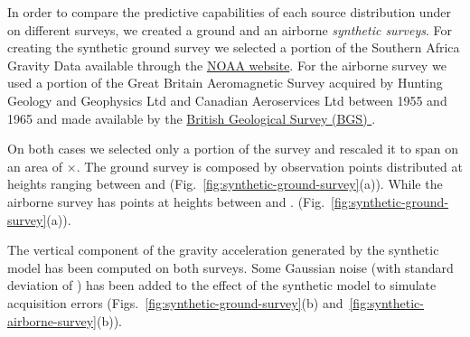 \documentclass[twocolumn]{article}
\begin{document}
In order to compare the predictive capabilities of each source distribution
under on different surveys, we created a ground and an airborne \emph{synthetic
surveys}.
For creating the synthetic ground survey we selected a portion of the Southern
Africa Gravity Data available through the
\href{https://www.ngdc.noaa.gov/mgg/gravity/gravity.html}{NOAA website}.
For the airborne survey we used a portion of the Great Britain Aeromagnetic
Survey acquired by Hunting Geology and Geophysics Ltd and Canadian Aeroservices
Ltd between 1955 and 1965 and made available by the
\href{https://www.bgs.ac.uk/products/geophysics/aeromagneticRegional.html}{
British Geological Survey (BGS)
}.

On both cases we selected only a portion of the survey and rescaled it to span
on an area of \SurveyEasting{}$\times$\SurveyNorthing{}.
The ground survey is composed by \GroundSurveyPoints{} observation points
distributed at heights ranging between \GroundSurveyMinHeight{} and
\GroundSurveyMaxHeight{} (Fig.~\ref{fig:synthetic-ground-survey}(a)).
While the airborne survey has \AirborneSurveyPoints{} points at heights between
\AirborneSurveyMinHeight{} and \AirborneSurveyMaxHeight{}.
(Fig.~\ref{fig:synthetic-ground-survey}(a)).

The vertical component of the gravity acceleration generated by the synthetic
model has been computed on both surveys.
Some Gaussian noise (with standard deviation of \SurveyNoise{}) has been added
to the effect of the synthetic model to simulate acquisition errors
(Figs.~\ref{fig:synthetic-ground-survey}(b)
and~\ref{fig:synthetic-airborne-survey}(b)).
\end{document}
